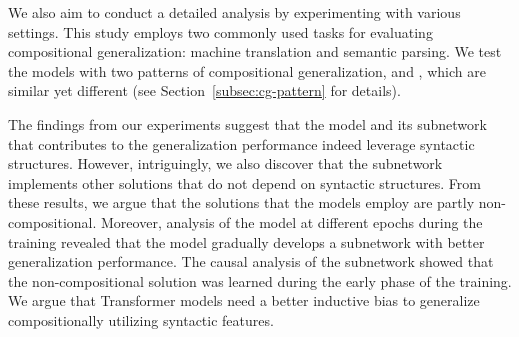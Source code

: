 We also aim to conduct a detailed analysis by experimenting with various settings.
This study employs two commonly used tasks for evaluating compositional generalization: machine translation and semantic parsing.
We test the models with two patterns of compositional generalization, \dobjppiobjpp{} and \dobjppsubjpp{}, which are similar yet different (see Section~\ref{subsec:cg-pattern} for details).

The findings from our experiments suggest that the model and its subnetwork that contributes to the generalization performance indeed leverage syntactic structures.
However, intriguingly, we also discover that the subnetwork implements other solutions that do not depend on syntactic structures.
From these results, we argue that the solutions that the models employ are partly non-compositional.
Moreover, analysis of the model at different epochs during the training revealed that the model gradually develops a subnetwork with better generalization performance.
The causal analysis of the subnetwork showed that the non-compositional solution was learned during the early phase of the training.
We argue that Transformer models need a better inductive bias to generalize compositionally utilizing syntactic features.